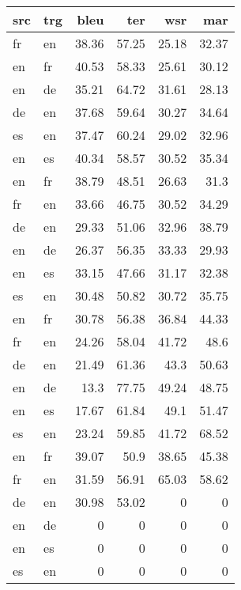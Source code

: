 \begin{tabular}{llrrrr}
\hline
 src   & trg   &   bleu &   ter &   wsr &   mar \\
\hline
 fr    & en    &  38.36 & 57.25 & 25.18 & 32.37 \\
 en    & fr    &  40.53 & 58.33 & 25.61 & 30.12 \\
 en    & de    &  35.21 & 64.72 & 31.61 & 28.13 \\
 de    & en    &  37.68 & 59.64 & 30.27 & 34.64 \\
 es    & en    &  37.47 & 60.24 & 29.02 & 32.96 \\
 en    & es    &  40.34 & 58.57 & 30.52 & 35.34 \\
 en    & fr    &  38.79 & 48.51 & 26.63 & 31.3  \\
 fr    & en    &  33.66 & 46.75 & 30.52 & 34.29 \\
 de    & en    &  29.33 & 51.06 & 32.96 & 38.79 \\
 en    & de    &  26.37 & 56.35 & 33.33 & 29.93 \\
 en    & es    &  33.15 & 47.66 & 31.17 & 32.38 \\
 es    & en    &  30.48 & 50.82 & 30.72 & 35.75 \\
 en    & fr    &  30.78 & 56.38 & 36.84 & 44.33 \\
 fr    & en    &  24.26 & 58.04 & 41.72 & 48.6  \\
 de    & en    &  21.49 & 61.36 & 43.3  & 50.63 \\
 en    & de    &  13.3  & 77.75 & 49.24 & 48.75 \\
 en    & es    &  17.67 & 61.84 & 49.1  & 51.47 \\
 es    & en    &  23.24 & 59.85 & 41.72 & 68.52 \\
 en    & fr    &  39.07 & 50.9  & 38.65 & 45.38 \\
 fr    & en    &  31.59 & 56.91 & 65.03 & 58.62 \\
 de    & en    &  30.98 & 53.02 &  0    &  0    \\
 en    & de    &   0    &  0    &  0    &  0    \\
 en    & es    &   0    &  0    &  0    &  0    \\
 es    & en    &   0    &  0    &  0    &  0    \\
\hline
\end{tabular}